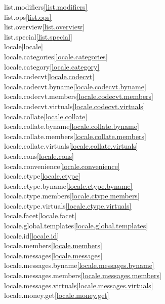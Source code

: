 \begin{multicols}{2}
list.modifiers\quad\ref{list.modifiers}\\
list.ops\quad\ref{list.ops}\\
list.overview\quad\ref{list.overview}\\
list.special\quad\ref{list.special}\\
locale\quad\ref{locale}\\
locale.categories\quad\ref{locale.categories}\\
locale.category\quad\ref{locale.category}\\
locale.codecvt\quad\ref{locale.codecvt}\\
locale.codecvt.byname\quad\ref{locale.codecvt.byname}\\
locale.codecvt.members\quad\ref{locale.codecvt.members}\\
locale.codecvt.virtuals\quad\ref{locale.codecvt.virtuals}\\
locale.collate\quad\ref{locale.collate}\\
locale.collate.byname\quad\ref{locale.collate.byname}\\
locale.collate.members\quad\ref{locale.collate.members}\\
locale.collate.virtuals\quad\ref{locale.collate.virtuals}\\
locale.cons\quad\ref{locale.cons}\\
locale.convenience\quad\ref{locale.convenience}\\
locale.ctype\quad\ref{locale.ctype}\\
locale.ctype.byname\quad\ref{locale.ctype.byname}\\
locale.ctype.members\quad\ref{locale.ctype.members}\\
locale.ctype.virtuals\quad\ref{locale.ctype.virtuals}\\
locale.facet\quad\ref{locale.facet}\\
locale.global.templates\quad\ref{locale.global.templates}\\
locale.id\quad\ref{locale.id}\\
locale.members\quad\ref{locale.members}\\
locale.messages\quad\ref{locale.messages}\\
locale.messages.byname\quad\ref{locale.messages.byname}\\
locale.messages.members\quad\ref{locale.messages.members}\\
locale.messages.virtuals\quad\ref{locale.messages.virtuals}\\
locale.money.get\quad\ref{locale.money.get}\\

\end{multicols}
